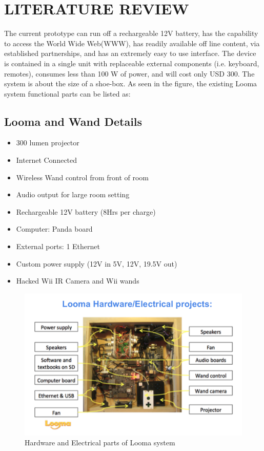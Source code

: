 \documentclass[12pt, a4paper]{article}
\begin{document}
\section{LITERATURE REVIEW}
The current prototype can run off a rechargeable 12V battery, has the capability to access the World Wide Web(WWW), has readily available off line content, via established partnerships, and has an extremely easy to use interface. The device is contained in a single unit with replaceable external components (i.e. keyboard, remotes), consumes less than 100 W of power, and will cost only USD 300. The system is about the size of a shoe-box. 
As seen in the figure, the existing Looma system functional parts can be listed as:

\subsection{Looma and Wand Details}
\begin{itemize}
\item300 lumen projector
\item Internet Connected 
\item Wireless Wand control from front of room
\item Audio output for large room setting
\item Rechargeable 12V battery (8Hrs per charge)
\item Computer: Panda board
\item External ports: 1 Ethernet
\item Custom power supply (12V in 5V, 12V, 19.5V out)
\item Hacked Wii IR Camera and Wii wands
\end{itemize}

\begin{figure}[htp]
\centering
\includegraphics[scale=0.22]{looma}
\caption{Hardware and Electrical parts of Looma system}
\label{}
\end{figure}
\end{document}
